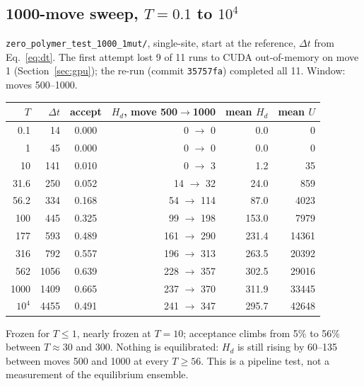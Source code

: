 \documentclass[11pt,a4paper]{article}
\newcommand{\dt}{\Delta t}
\newcommand{\Hd}{H_d}
\newcommand{\file}[1]{\texttt{#1}}
\begin{document}
\subsection{\texorpdfstring{1000-move sweep, $T=0.1$ to $10^4$}{1000-move sweep, T=0.1 to 1e4}}
\file{zero\_polymer\_test\_1000\_1mut/}, single-site, start at the reference,
$\dt$ from Eq.~\eqref{eq:dt}. The first attempt lost 9 of 11 runs to CUDA
out-of-memory on move 1 (Section~\ref{sec:gpu}); the re-run (commit
\texttt{35757fa}) completed all 11. Window: moves 500--1000.
\begin{center}
\begin{tabular}{@{}rrcrrr@{}}
\toprule
$T$ & $\dt$ & accept & $\Hd$, move 500$\to$1000 & mean $\Hd$ & mean $U$ \\
\midrule
0.1    & 14  & 0.000 & 0 $\to$ 0     & 0.0   & 0 \\
1      & 45  & 0.000 & 0 $\to$ 0     & 0.0   & 0 \\
10     & 141 & 0.010 & 0 $\to$ 3     & 1.2   & 35 \\
31.6   & 250 & 0.052 & 14 $\to$ 32   & 24.0  & 859 \\
56.2   & 334 & 0.168 & 54 $\to$ 114  & 87.0  & 4023 \\
100    & 445 & 0.325 & 99 $\to$ 198  & 153.0 & 7979 \\
177    & 593 & 0.489 & 161 $\to$ 290 & 231.4 & 14361 \\
316    & 792 & 0.557 & 196 $\to$ 313 & 263.5 & 20392 \\
562    & 1056 & 0.639 & 228 $\to$ 357 & 302.5 & 29016 \\
1000   & 1409 & 0.665 & 237 $\to$ 370 & 311.9 & 33445 \\
$10^4$ & 4455 & 0.491 & 241 $\to$ 347 & 295.7 & 42648 \\
\bottomrule
\end{tabular}
\end{center}
Frozen for $T\le1$, nearly frozen at $T=10$; acceptance climbs from 5\% to 56\%
between $T\approx30$ and $300$. Nothing is equilibrated: $\Hd$ is still rising by
60--135 between moves 500 and 1000 at every $T\ge56$. This is a pipeline test,
not a measurement of the equilibrium ensemble.
\end{document}
